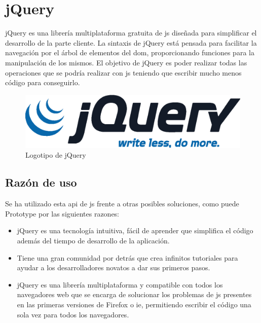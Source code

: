 \section{jQuery}

jQuery\cite{jQuery} es una librería multiplataforma gratuita de \acrfull{js} diseñada para simplificar el desarrollo de la parte cliente. La sintaxis de jQuery está pensada para facilitar la navegación por el árbol de elementos del \acrfull{dom}, proporcionando funciones para la manipulación de los mismos. El objetivo de jQuery es poder realizar todas las operaciones que se podría realizar con \acrshort{js} teniendo que escribir mucho menos código para conseguirlo.

\begin{figure}[!htbp]
	\centering
	\includegraphics[scale=0.6]{fig/jquery_logo}
	\caption{Logotipo de jQuery}
\end{figure}

\subsection{Razón de uso}

Se ha utilizado esta \acrshort{api} de \acrshort{js} frente a otras posibles soluciones, como puede Prototype\cite{Prototype} por las siguientes razones:

\begin{itemize}
	\item jQuery es una tecnología intuitiva, fácil de aprender que simplifica el código además del tiempo de desarrollo de la aplicación.
	\item Tiene una gran comunidad por detrás que crea infinitos tutoriales para ayudar a los desarrolladores novatos a dar sus primeros pasos.
	\item jQuery es una librería multiplataforma y compatible con todos los navegadores web que se encarga de solucionar los problemas de \acrshort{js} presentes en las primeras versiones de Firefox\cite{Firefox} o \acrfull{ie}\cite{IE}, permitiendo escribir el código una sola vez para todos los navegadores.
\end{itemize}

